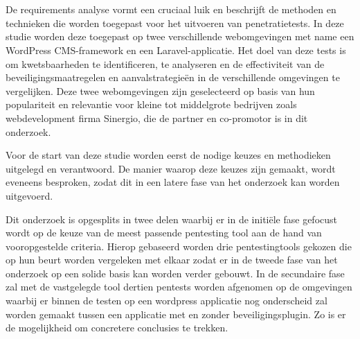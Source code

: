 \section{}
De requirements analyse vormt een cruciaal luik en beschrijft de methoden en technieken die worden toegepast 
voor het uitvoeren van penetratietests. In deze studie worden deze toegepast op twee 
verschillende webomgevingen met name een WordPress CMS-framework en een Laravel-applicatie. Het doel van deze tests is om kwetsbaarheden te identificeren, te 
analyseren en de effectiviteit van de beveiligingsmaatregelen en aanvalstrategieën in de verschillende omgevingen te vergelijken.
Deze twee webomgevingen zijn geselecteerd op basis van hun populariteit en relevantie voor kleine tot middelgrote bedrijven 
zoals webdevelopment firma Sinergio, die de partner en co-promotor is in dit onderzoek.

Voor de start van deze studie worden eerst de nodige keuzes en methodieken uitgelegd en verantwoord. De manier waarop deze keuzes zijn gemaakt, wordt eveneens 
besproken, zodat dit in een latere fase van het onderzoek kan worden uitgevoerd.

Dit onderzoek is opgesplits in twee delen waarbij er in de initiële fase gefocust wordt op de keuze van de meest passende pentesting tool 
aan de hand van vooropgestelde criteria. Hierop gebaseerd worden drie pentestingtools gekozen die op hun beurt worden vergeleken met elkaar 
zodat er in de tweede fase van het onderzoek op een solide basis kan worden verder gebouwt. In de secundaire fase zal met de vastgelegde 
tool dertien pentests worden afgenomen op de omgevingen waarbij er binnen de testen op een wordpress applicatie nog onderscheid zal worden gemaakt 
tussen een applicatie met en zonder beveiligingsplugin. Zo is er de mogelijkheid om concretere conclusies te trekken.

